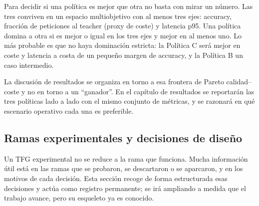 \documentclass[11pt,a4paper]{article}
\begin{document}
Para decidir si una política es mejor que otra no basta con mirar un número. Las tres conviven en un espacio multiobjetivo con al menos tres ejes: accuracy, fracción de peticiones al teacher (proxy de coste) y latencia p95. Una política domina a otra si es mejor o igual en los tres ejes y mejor en al menos uno. Lo más probable es que no haya dominación estricta: la Política C será mejor en coste y latencia a costa de un pequeño margen de accuracy, y la Política B un caso intermedio.

La discusión de resultados se organiza en torno a esa frontera de Pareto calidad--coste y no en torno a un ``ganador''. En el capítulo de resultados se reportarán las tres políticas lado a lado con el mismo conjunto de métricas, y se razonará en qué escenario operativo cada una es preferible.

\subsection{Ramas experimentales y decisiones de diseño}
\label{subsec:ramas-experimentales}

Un TFG experimental no se reduce a la rama que funciona. Mucha información útil está en las ramas que se probaron, se descartaron o se aparcaron, y en los motivos de cada decisión. Esta sección recoge de forma estructurada esas decisiones y actúa como registro permanente; se irá ampliando a medida que el trabajo avance, pero su esqueleto ya es conocido.
\end{document}
